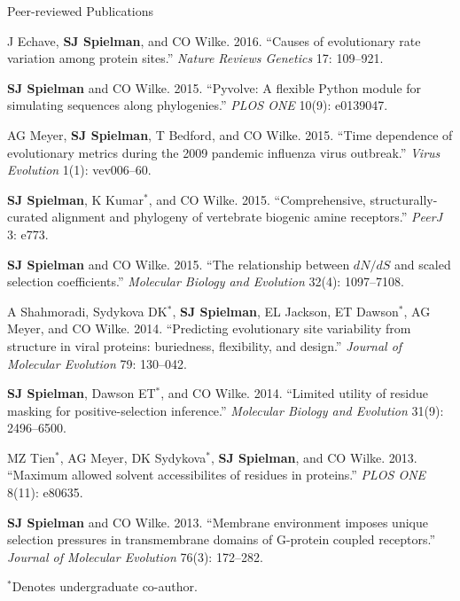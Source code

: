 \documentclass{resume} %
\begin{document}
\begin{rSection}{Peer-reviewed Publications}
\begin{etaremune}[leftmargin=1.5em]
\item J Echave, \textbf{SJ Spielman}, and CO Wilke. 2016. ``Causes of evolutionary rate variation among protein sites.'' \emph{Nature Reviews Genetics} 17: 109--921.

\item \textbf{SJ Spielman} and CO Wilke. 2015. ``Pyvolve: A flexible Python module for simulating sequences along phylogenies.'' \emph{PLOS ONE} 10(9): e0139047.

\item AG Meyer, \textbf{SJ Spielman}, T Bedford, and CO Wilke. 2015. ``Time dependence of evolutionary metrics during the 2009 pandemic influenza virus outbreak.'' \emph{Virus Evolution} 1(1): vev006--60.

\item \textbf{SJ Spielman}, K Kumar$^\ast$, and CO Wilke. 2015. ``Comprehensive, structurally-curated alignment and phylogeny of vertebrate biogenic amine receptors.'' \emph{PeerJ} 3: e773.

\item \textbf{SJ Spielman} and CO Wilke. 2015. ``The relationship between $dN/dS$ and scaled selection coefficients.'' \emph{Molecular Biology and Evolution} 32(4): 1097--7108.

\item A Shahmoradi, Sydykova DK$^\ast$, \textbf{SJ Spielman}, EL Jackson, ET Dawson$^\ast$, AG Meyer, and CO Wilke. 2014. ``Predicting evolutionary site variability from structure in viral proteins: buriedness, flexibility, and design.'' \emph{Journal of Molecular Evolution} 79: 130--042.

\item \textbf{SJ Spielman}, Dawson ET$^\ast$, and CO Wilke. 2014. ``Limited utility of residue masking for positive-selection inference.'' \emph{Molecular Biology and Evolution} 31(9): 2496--6500.

\item MZ Tien$^\ast$, AG Meyer, DK Sydykova$^\ast$, \textbf{SJ Spielman}, and CO Wilke. 2013. ``Maximum allowed solvent accessibilites of residues in proteins.'' \emph{PLOS ONE} 8(11): e80635.

\item \textbf{SJ Spielman} and CO Wilke. 2013. ``Membrane environment imposes unique selection pressures in transmembrane domains of G-protein coupled receptors.'' \emph{Journal of Molecular Evolution} 76(3): 172--282.

\end{etaremune}

$^\ast$Denotes undergraduate co-author.
\end{rSection}
\end{document}
